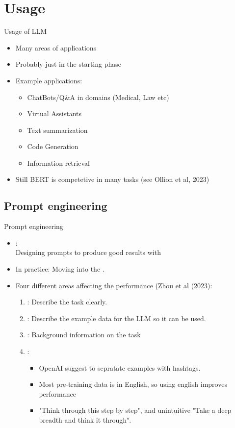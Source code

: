 \documentclass[10pt]{beamer}
\begin{document}
\section{Usage}

\begin{frame}{Usage of LLM}
\begin{itemize}
\item Many areas of applications
\item Probably just in the starting phase
\pause
\item Example applications:
\begin{itemize}
\item ChatBots/Q\&A in domains (Medical, Law etc)
\item Virtual Assistants
\item Text summarization
\item Code Generation
\item Information retrieval
\end{itemize}
\pause
\item Still BERT is competetive in many tasks (see Ollion et al, 2023)
\end{itemize}
\end{frame}


\subsection{Prompt engineering}

\begin{frame}{Prompt engineering}

\begin{itemize}
\item {}: \\Designing prompts to produce good results with 
\item In practice: Moving into the .
\pause
\item Four different areas affecting the performance (Zhou et al (2023):
\begin{enumerate}
\pause
\item {}: Describe the task clearly.
\pause
\item {}: Describe the example data for the LLM so it can be used.
\pause
\item {}: Background information on the task
\pause
\item {}:
\begin{itemize}
\item OpenAI suggest to sepratate examples with hashtags.
\item Most pre-training data is in English, so using english improves performance
\item "Think through this step by step", and unintuitive "Take a deep breadth and think it through".
\end{itemize}
\end{enumerate}
\end{itemize}

\end{frame}
\end{document}

